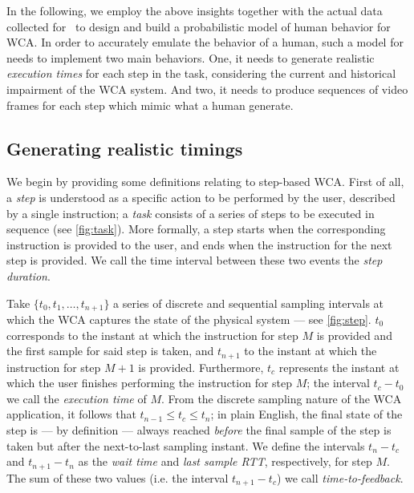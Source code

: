 In the following, we employ the above insights together with the actual data collected for~\cite{olguinmunoz:impact2021} to design and build a probabilistic model of human behavior for \ac{WCA}.
In order to accurately emulate the behavior of a human, such a model for needs to implement two main behaviors.
One, it needs to generate realistic \emph{execution times} for each step in the task, considering the current and historical impairment of the \ac{WCA} system.
And two, it needs to produce sequences of video frames for each step which mimic what a human generate.

\subsection{Generating realistic timings}

We begin by providing some definitions relating to step-based \acl{WCA}.
First of all, a \emph{step} is understood as a specific action to be performed by the user, described by a single instruction; a \emph{task} consists of a series of steps to be executed in sequence (see \cref{fig:task}).
More formally, a step starts when the corresponding instruction is provided to the user, and ends when the instruction for the next step is provided.
We call the time interval between these two events the \emph{step duration}.

Take \( \{ t_0, t_1, \ldots, t_{n + 1} \} \) a series of discrete and sequential sampling intervals at which the \ac{WCA} captures the state of the physical system --- see \cref{fig:step}.
\( t_0 \) corresponds to the instant at which the instruction for step \( M \) is provided and the first sample for said step is taken, and \( t_{n+1} \) to the instant at which the instruction for step \( M + 1 \) is provided.
Furthermore, \( t_c \) represents the instant at which the user finishes performing the instruction for step \( M \); the interval \( t_c - t_0 \) we call the \emph{execution time} of \( M \).
From the discrete sampling nature of the \ac{WCA} application, it follows that \( t_{n - 1} \leq t_c \leq t_{n} \); in plain English, the final state of the step is --- by definition --- always reached \emph{before} the final sample of the step is taken but after the next-to-last sampling instant.
We define the intervals \( t_n - t_c \) and \( t_{n + 1} - t_n \) as the \emph{wait time} and \emph{last sample \ac{RTT}}, respectively, for step \( M \).
The sum of these two values (i.e. the interval \( t_{n + 1} - t_c \)) we call \emph{time-to-feedback}.

